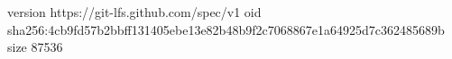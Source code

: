 version https://git-lfs.github.com/spec/v1
oid sha256:4cb9fd57b2bbff131405ebe13e82b48b9f2c7068867e1a64925d7c362485689b
size 87536
